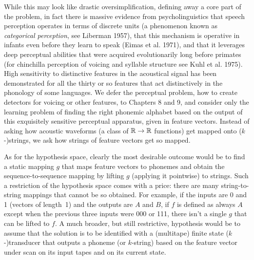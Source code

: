 While this may look like drastic oversimplification, defining away a core part
of the problem, in fact there is massive evidence from psycholinguistics that
speech perception operates in terms of discrete units (a phenomenon known as
{\it categorical perception}, see Liberman
1957), that this mechanism is operative in infants even before they learn to
speak (Eimas et al. 1971), and that it leverages deep perceptual abilities
that were acquired evolutionarily long before primates (for chinchilla
perception of voicing and syllable structure see Kuhl et
al. 1975).\nocite{Eimas:1971}\nocite{Kuhl:1975} High sensitivity to
distinctive features in the acoustical signal has been demonstrated for all
the thirty or so features that act distinctively in the phonology of some
languages. We defer the perceptual problem, how to create detectors for
voicing or other features, to Chapters 8 and 9, and consider only the learning
problem of finding the right phonemic alphabet based on the output of this
exquisitely sensitive perceptual apparatus, given in feature vectors. Instead
of asking how acoustic waveforms (a class of ${\Bbb R} \rightarrow {\Bbb R}$
functions) get mapped onto ($k$-)strings, we ask how strings of feature
vectors get so mapped.

As for the hypothesis space, clearly the most desirable outcome would be to
find a static mapping $g$ that maps feature vectors to phonemes and obtain the
sequence-to-sequence mapping by lifting $g$ (applying it pointwise) to
strings. Such a restriction of the hypothesis space comes with a price: there
are many string-to-string mappings that cannot be so obtained. For example, if
the inputs are 0 and 1 (vectors of length~1) and the outputs are $A$ and $B$,
if $f$ is defined as always $A$ except when the previous three inputs were 000
or 111, there isn't a single $g$ that can be lifted to $f$. A much broader,
but still restrictive, hypothesis would be to assume that the solution is to
be identified with a (multitape) finite state ($k$-)transducer that outputs a
phoneme (or $k$-string) based on the feature vector under scan on its input
tapes and on its current state.

